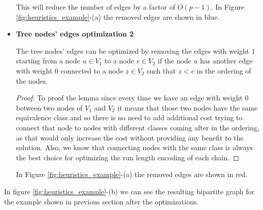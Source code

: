 \begin{itemize}
    This will reduce the number of edges by a factor of $O(p - 1)$. In Figure \ref{fig:heuristics_example}-(a) the removed edges are shown in blue.

    \item \textbf{Tree nodes' edges optimization 2}:
    \begin{lemma} \label{lemma:tree_optimization_2}
        The tree nodes' edges can be optimized by removing the edges with weight $1$ starting from a node $u \in V_1$ to a node $v \in V_2$ if the node $u$ has another edge with weight $0$ connected to a node $z \in V_2$ such that $z < v$ in the ordering of the nodes.
    \end{lemma}

    \begin{proof}
        To proof the lemma since every time we have an edge with weight $0$ between two nodes of $V_1$ and $V_2$ it means that those two nodes have the same equivalence class and so there is no need to add additional cost trying to connect that node to nodes with different classes coming after in the ordering, as that would only increase the cost without providing any benefit to the solution. Also, we know that connecting nodes with the same class is always the best choice for optimizing the run length encoding of each chain.
    \end{proof}

    In Figure \ref{fig:heuristics_example}-(a) the removed edges are shown in red.
\end{itemize}

In figure \ref{fig:heuristics_example}-(b) we can see the resulting bipartite graph for the example shown in previous section after the optimizations.

